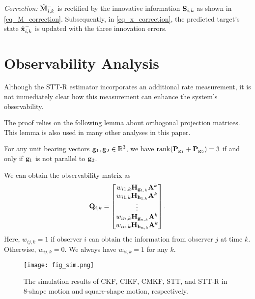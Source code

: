 \documentclass[letterpaper, 10 pt, conference]{ieeeconf}  %
\begin{document}
\emph{Correction:} $\hat{\M}_{i,k}^{-}$ is rectified by the innovative information $\S_{i,k}$ as shown in \eqref{eq_M_correction}. Subsequently, in \eqref{eq_x_correction}, the predicted target's state $\hat{\x}_{i,k}^{-}$ is updated with the three innovation errors.

\section{Observability Analysis}\label{sec_obs}

Although the STT-R estimator incorporates an additional rate measurement, it is not immediately clear how this measurement can enhance the system's observability. 

The proof relies on the following lemma about orthogonal projection matrices. This lemma is also used in many other analyses in this paper.

\begin{lemma}\label{lemma_rank_P_1_P_2}
For any unit bearing vectors $\g_1, \g_2\in\mathbb{R}^3$, we have ${\rm rank}(\P_{\g_1}+\P_{\g_2})=3$ if and only if $\g_1$ is not parallel to $\g_2$.
\end{lemma}

We can obtain the observability matrix as
\begin{align}
\mathbf{Q}_{i,k} =
\begin{bmatrix}
w_{i1,k}\H_{\g_{1, k}}\A^k\\
w_{i1,k}\H_{\h_{1, k}}\A^k\\
\vdots\\
w_{in,k}\H_{\g_{n, k}}\A^k\\
w_{in,k}\H_{\h_{n, k}}\A^k
\end{bmatrix}.\label{eq_obv_matrix}
\end{align}
Here, $w_{ij,k}=1$ if observer $i$ can obtain the information from observer $j$ at time $k$. Otherwise, $w_{ij,k}=0$.
We always have $w_{ii,k}=1$ for any $k$.

\begin{figure*}
    \centering
    \texttt{[image: fig\_sim.png]}
    \caption{The simulation results of CKF, CIKF, CMKF, STT, and STT-R in 8-shape motion and square-shape motion, respectively.}\label{fig_sim}
\end{figure*}
\end{document}
